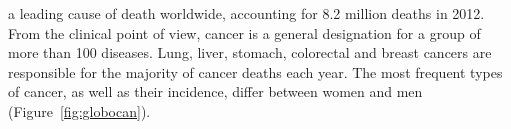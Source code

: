 







\medskip

 a leading cause of death worldwide, accounting
for 8.2 million deaths in 2012.  From the clinical point of view, cancer is a
general designation for a group of more than 100 diseases.  Lung, liver,
stomach, colorectal and breast cancers are responsible for the majority of
cancer deaths each year.  The most frequent types of cancer, as well as their
incidence, differ between women and men (Figure~\ref{fig:globocan}).

